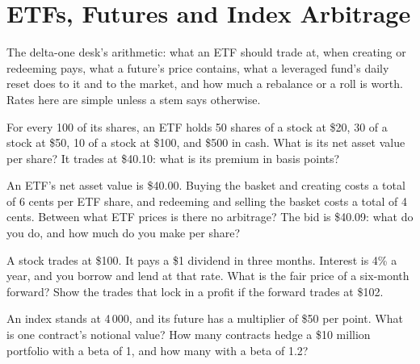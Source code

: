 \chapter{ETFs, Futures and Index Arbitrage}\label{ch:iv2:etfs-futures-and-index-arbitrage}

\begin{ivtrains}
The delta-one desk's arithmetic: what an ETF should trade at, when creating or redeeming pays, what a future's price contains, what a leveraged fund's daily reset does to it and to the market, and how much a rebalance or a roll is worth. Rates here are simple unless a stem says otherwise.
\end{ivtrains}

\begin{question}\label{iq:iv2:etfs-futures-and-index-arbitrage:1}
For every 100 of its shares, an ETF holds 50 shares of a stock at \$20, 30 of a stock at \$50, 10 of a stock at \$100, and \$500 in cash. What is its net asset value per share? It trades at \$40.10: what is its premium in basis points?
\end{question}

\begin{question}\label{iq:iv2:etfs-futures-and-index-arbitrage:2}
An ETF's net asset value is \$40.00. Buying the basket and creating costs a total of 6 cents per ETF share, and redeeming and selling the basket costs a total of 4 cents. Between what ETF prices is there no arbitrage? The bid is \$40.09: what do you do, and how much do you make per share?
\end{question}

\begin{question}\label{iq:iv2:etfs-futures-and-index-arbitrage:3}
A stock trades at \$100. It pays a \$1 dividend in three months. Interest is 4\% a year, and you borrow and lend at that rate. What is the fair price of a six-month forward? Show the trades that lock in a profit if the forward trades at \$102.
\end{question}

\begin{question}\label{iq:iv2:etfs-futures-and-index-arbitrage:4}
An index stands at 4\,000, and its future has a multiplier of \$50 per point. What is one contract's notional value? How many contracts hedge a \$10 million portfolio with a beta of 1, and how many with a beta of 1.2?
\end{question}

